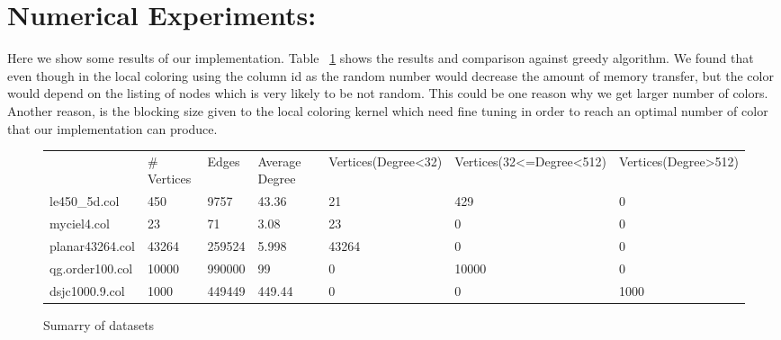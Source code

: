 \documentclass[12pt] {article}
\begin{document}

\section*{Numerical Experiments:}
Here we show some results of our implementation. Table ~\ref{tab:results} shows the results and comparison against greedy algorithm. We found that even though in the local coloring using the column id as the random number would decrease the amount of memory transfer, but the color would depend on the listing of nodes which is very likely to be not random. This could be one reason why we get larger number of colors. Another reason, is the blocking size given to the local coloring kernel which need fine tuning in order to reach an optimal number of color that our implementation can produce. 


\begin{figure}[tbh]
 \centering    
\begin{tabular}{ |p{3cm}||p{2cm}| p{2cm}|p{2cm}|p{2cm}|p{2cm}|p{2cm}|}
 \hline
   & $\#$Vertices & Edges &  Average Degree & Vertices(Degree<32) & Vertices(32<=Degree<512) &Vertices(Degree>512) \\ 
     
     \hhline{|=||=|=|=|=|=|=|}
 \hline
 le450\_5d.col &450       & 9757  & 43.36 &21  &429 & 0\\
 \hline
 myciel4.col &  23       & 71  &3.08  &23  &0  &0\\
 \hline
   planar43264.col & 43264     &  259524 & 5.998  &43264 & 0 &0 \\
 \hline
   qg.order100.col &10000  &990000  & 99  & 0 & 10000 & 0 \\
 \hline
   dsjc1000.9.col & 1000  & 449449 & 449.44  & 0 & 0 & 1000 \\
 \hline
 \hline
 
 
\end{tabular} 
\caption{Sumarry of datasets}
   \label{tab:results}
\end{figure} 
\end{document}

